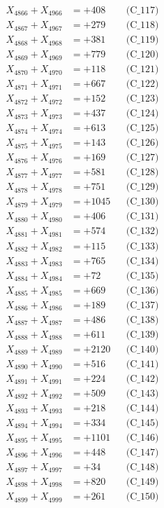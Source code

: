 \documentclass[a4paper,10pt]{article}
\begin{document}
{\begin{align}
X_{4866} + X_{4966} &= +408 && \text{(C\_117)} \\
X_{4867} + X_{4967} &= +279 && \text{(C\_118)} \\
X_{4868} + X_{4968} &= +381 && \text{(C\_119)} \\
X_{4869} + X_{4969} &= +779 && \text{(C\_120)} \\
\allowbreak
X_{4870} + X_{4970} &= +118 && \text{(C\_121)} \\
X_{4871} + X_{4971} &= +667 && \text{(C\_122)} \\
X_{4872} + X_{4972} &= +152 && \text{(C\_123)} \\
X_{4873} + X_{4973} &= +437 && \text{(C\_124)} \\
X_{4874} + X_{4974} &= +613 && \text{(C\_125)} \\
\allowbreak
X_{4875} + X_{4975} &= +143 && \text{(C\_126)} \\
X_{4876} + X_{4976} &= +169 && \text{(C\_127)} \\
X_{4877} + X_{4977} &= +581 && \text{(C\_128)} \\
X_{4878} + X_{4978} &= +751 && \text{(C\_129)} \\
X_{4879} + X_{4979} &= +1045 && \text{(C\_130)} \\
\allowbreak
X_{4880} + X_{4980} &= +406 && \text{(C\_131)} \\
X_{4881} + X_{4981} &= +574 && \text{(C\_132)} \\
X_{4882} + X_{4982} &= +115 && \text{(C\_133)} \\
X_{4883} + X_{4983} &= +765 && \text{(C\_134)} \\
X_{4884} + X_{4984} &= +72 && \text{(C\_135)} \\
\allowbreak
X_{4885} + X_{4985} &= +669 && \text{(C\_136)} \\
X_{4886} + X_{4986} &= +189 && \text{(C\_137)} \\
X_{4887} + X_{4987} &= +486 && \text{(C\_138)} \\
X_{4888} + X_{4988} &= +611 && \text{(C\_139)} \\
X_{4889} + X_{4989} &= +2120 && \text{(C\_140)} \\
\allowbreak
X_{4890} + X_{4990} &= +516 && \text{(C\_141)} \\
X_{4891} + X_{4991} &= +224 && \text{(C\_142)} \\
X_{4892} + X_{4992} &= +509 && \text{(C\_143)} \\
X_{4893} + X_{4993} &= +218 && \text{(C\_144)} \\
X_{4894} + X_{4994} &= +334 && \text{(C\_145)} \\
\allowbreak
X_{4895} + X_{4995} &= +1101 && \text{(C\_146)} \\
X_{4896} + X_{4996} &= +448 && \text{(C\_147)} \\
X_{4897} + X_{4997} &= +34 && \text{(C\_148)} \\
X_{4898} + X_{4998} &= +820 && \text{(C\_149)} \\
X_{4899} + X_{4999} &= +261 && \text{(C\_150)} \\
\end{align}
}
\end{document}
